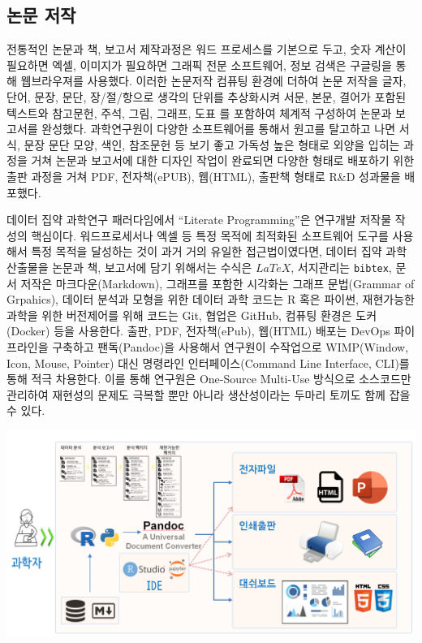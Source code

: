 \documentclass[smallextended]{svjour3}       %
\begin{document}
\hypertarget{uxb17cuxbb38-uxc800uxc791}{%
\subsection{논문 저작}\label{uxb17cuxbb38-uxc800uxc791}}

전통적인 논문과 책, 보고서 제작과정은 워드 프로세스를 기본으로 두고,
숫자 계산이 필요하면 엑셀, 이미지가 필요하면 그래픽 전문 소프트웨어,
정보 검색은 구글링을 통해 웹브라우져를 사용했다. 이러한 논문저작 컴퓨팅
환경에 더하여 논문 저작을 글자, 단어, 문장, 문단, 장/절/항으로 생각의
단위를 추상화시켜 서문, 본문, 결어가 포함된 텍스트와 참고문헌, 주석,
그림, 그래프, 도표 를 포함하여 체계적 구성하여 논문과 보고서를 완성했다.
과학연구원이 다양한 소프트웨어를 통해서 원고를 탈고하고 나면 서식, 문장
문단 모양, 색인, 참조문헌 등 보기 좋고 가독성 높은 형태로 외양을 입히는
과정을 거쳐 논문과 보고서에 대한 디자인 작업이 완료되면 다양한 형태로
배포하기 위한 출판 과정을 거쳐 PDF, 전자책(ePUB), 웹(HTML), 출판책
형태로 R\&D 성과물을 배포했다.

데이터 집약 과학연구 패러다임에서 ``Literate Programming''은 연구개발
저작물 작성의 핵심이다. 워드프로세서나 엑셀 등 특정 목적에 최적화된
소프트웨어 도구를 사용해서 특정 목적을 달성하는 것이 과거 거의 유일한
접근법이였다면, 데이터 집약 과학 산출물을 논문과 책, 보고서에 담기
위해서는 수식은 \(LaTeX\), 서지관리는 \texttt{bibtex}, 문서 저작은
마크다운(Markdown), 그래프를 포함한 시각화는 그래프 문법(Grammar of
Grpahics), 데이터 분석과 모형을 위한 데이터 과학 코드는 R 혹은 파이썬,
재현가능한 과학을 위한 버전제어를 위해 코드는 Git, 협업은 GitHub, 컴퓨팅
환경은 도커(Docker) 등을 사용한다. 출판, PDF, 전자책(ePub), 웹(HTML)
배포는 DevOps 파이프라인을 구축하고 팬독(Pandoc)을 사용해서 연구원이
수작업으로 WIMP(Window, Icon, Mouse, Pointer) 대신 명령라인
인터페이스(Command Line Interface, CLI)를 통해 적극 차용한다. 이를 통해
연구원은 One-Source Multi-Use 방식으로 소스코드만 관리하여 재현성의
문제도 극복할 뿐만 아니라 생산성이라는 두마리 토끼도 함께 잡을 수 있다.

\includegraphics{fig/koita-writing.png}
\end{document}
